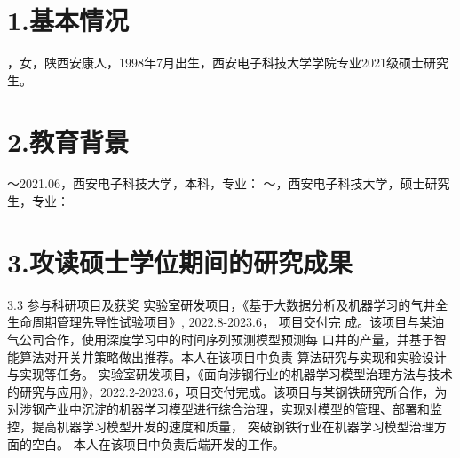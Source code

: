 \begin{resume}
\section*{1.\hspace{0.75em}基本情况}
，女，陕西安康人，1998年7月出生，西安电子科技大学学院专业2021级硕士研究生。
\section*{2.\hspace{0.75em}教育背景}
\begin{resumelist*}
～2021.06，西安电子科技大学，本科，专业：
～\phantom{}，西安电子科技大学，硕士研究生，专业：
\end{resumelist*}
\section*{3.\hspace{0.75em}攻读硕士学位期间的研究成果}
\begin{resumelist}{\hspace{-0.25em}3.3\hspace{0.5em} 参与科研项目及获奖}
\resumelistitem 实验室研发项目，《基于大数据分析及机器学习的气井全生命周期管理先导性试验项目》, 2022.8-2023.6， 项目交付完
成。该项目与某油气公司合作，使用深度学习中的时间序列预测模型预测每
口井的产量，并基于智能算法对开关井策略做出推荐。本人在该项目中负责
算法研究与实现和实验设计与实现等任务。
\resumelistitem 实验室研发项目，《面向涉钢行业的机器学习模型治理方法与技术的研究与应用》，2022.2-2023.6，项目交付完成。该项目与某钢铁研究所合作，为对涉钢产业中沉淀的机器学习模型进行综合治理，实现对模型的管理、部署和监控，提高机器学习模型开发的速度和质量，
突破钢铁行业在机器学习模型治理方面的空白。 本人在该项目中负责后端开发的工作。
\end{resumelist}
\end{resume}
